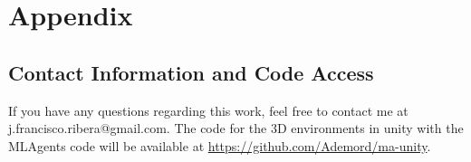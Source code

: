\chapter{Appendix}\label{sec:chapAppendix}

\section{Contact Information and Code Access} \label{appendix:github}
If you have any questions regarding this work, feel free to contact me at j.francisco.ribera@gmail.com. The code for the 3D environments in unity with the MLAgents code will be available at \url{https://github.com/Ademord/ma-unity}.

\newpage



